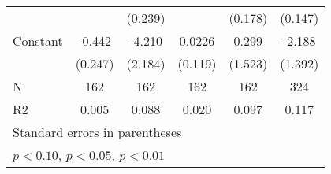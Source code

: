 {\begin{tabular}{l*{5}{c}}
                    &                     &     (0.239)         &                     &     (0.178)         &     (0.147)         \\
[1em]
Constant            &      -0.442\sym{*}  &      -4.210\sym{*}  &      0.0226         &       0.299         &      -2.188         \\
                    &     (0.247)         &     (2.184)         &     (0.119)         &     (1.523)         &     (1.392)         \\
\hline
N                   &         162         &         162         &         162         &         162         &         324         \\
R2                  &       0.005         &       0.088         &       0.020         &       0.097         &       0.117         \\
\hline\hline
\multicolumn{6}{l}{\footnotesize Standard errors in parentheses}\\
\multicolumn{6}{l}{\footnotesize \sym{*} \(p<0.10\), \sym{**} \(p<0.05\), \sym{***} \(p<0.01\)}\\
\end{tabular}
}

